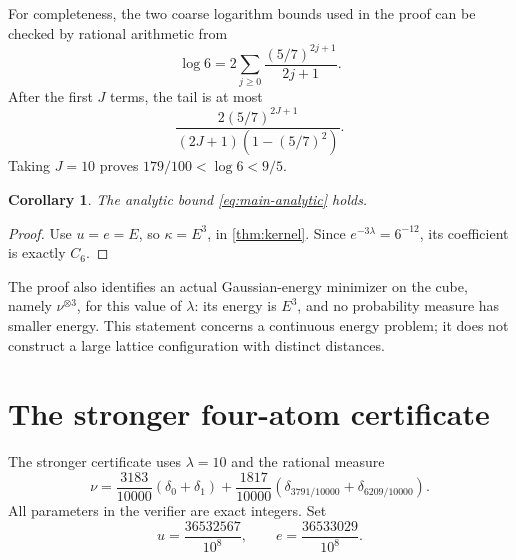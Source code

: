 \documentclass[11pt,letterpaper]{article}
\newtheorem{corollary}[theorem]{Corollary}
\theoremstyle{definition}
\begin{document}
For completeness, the two coarse logarithm bounds used in the proof
can be checked by rational arithmetic from
\[
 \log6=2\sum_{j\ge0}\frac{(5/7)^{2j+1}}{2j+1}.
\]
After the first \(J\) terms, the tail is at most
\[
 \frac{2(5/7)^{2J+1}}{(2J+1)(1-(5/7)^2)}.
\]
Taking \(J=10\) proves \(179/100<\log6<9/5\).

\begin{corollary}
The analytic bound \cref{eq:main-analytic} holds.
\end{corollary}
\begin{proof}
Use \(u=e=E\), so \(\kappa=E^3\), in \cref{thm:kernel}.
Since \(e^{-3\lambda}=6^{-12}\), its coefficient is exactly \(C_6\).
\end{proof}

The proof also identifies an actual Gaussian-energy minimizer on the
cube, namely \(\nu^{\otimes3}\), for this value of \(\lambda\):
its energy is \(E^3\), and no probability measure has smaller energy.
This statement concerns a continuous energy problem; it does not
construct a large lattice configuration with distinct distances.

\section{The stronger four-atom certificate}
\label{sec:computer-certificate}
The stronger certificate uses \(\lambda=10\) and the rational measure
\[
 \nu=
 \frac{3183}{10000}(\delta_0+\delta_1)
 +\frac{1817}{10000}
  (\delta_{3791/10000}+\delta_{6209/10000}).
\]
All parameters in the verifier are exact integers. Set
\begin{equation}
 u=\frac{36532567}{10^8},\qquad
 e=\frac{36533029}{10^8}.
 \label{eq:ue}
\end{equation}
\end{document}
